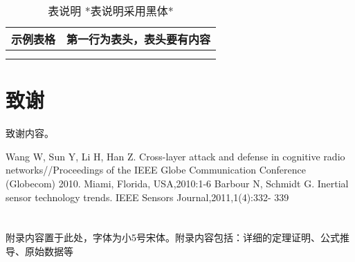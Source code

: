 \documentclass{cjc}
\begin{document}
\begin{table}[htb]
  \centering
  \caption{表说明 *表说明采用黑体*}
  \small
  \begin{tabular}{cc}
    \toprule
    示例表格 & 第一行为表头，表头要有内容 \\
    \midrule
    & \\
    \midrule
    & \\
    \bottomrule
  \end{tabular}
\end{table}

\section*{致谢}

致谢内容。

\nocite{*}

\begin{thebibliography}{99}
  \addtolength{\itemsep}{-1.5ex}
  Wang W, Sun Y, Li H, Han Z. Cross-layer attack and defense in cognitive radio networks//Proceedings of the IEEE Globe Communication Conference (Globecom) 2010. Miami, Florida, USA,2010:1-6
  Barbour N, Schmidt G. Inertial sensor technology trends. IEEE Sensors Journal,2011,1(4):332- 339
  \end{thebibliography}

\appendix

\section{}

附录内容置于此处，字体为小5号宋体。附录内容包括：详细的定理证明、公式推导、原始数据等










\end{document}
